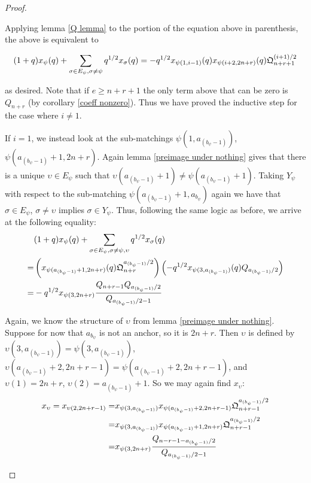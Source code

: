\documentclass{amsart}
\begin{document}
\begin{proof}
\begin{enumerate}[label={case \arabic*:}]
 		Applying lemma \ref{Q lemma} to the portion of the equation above in parenthesis, the above is equivalent to
 		
 		$$(1+q)x_\psi(q)+\sum_{\sigma\in E_\psi,\sigma\not=\psi}q^{1/2}x_\sigma(q)=-q^{1/2}x_{\psi(1,i-1)}(q)x_{\psi(i+2,2n+r)}(q)\mathfrak{Q}_{n+r+1}^{(i+1)/2}$$
 		
 		as desired. Note that if $e\geq n+r+1$ the only term above that can be zero is $Q_{n+r}$ (by corollary \ref{coeff nonzero}). Thus we have proved the inductive step for the case where $i\not=1$.
 		
 		\vspace{5mm}
 		If $i=1$, we instead look at the sub-matchings $\psi(1,a_{(b_\psi-1)})$, $\psi(a_{(b_\psi-1)}+1,2n+r)$. Again lemma \ref{preimage under nothing} gives that there is a unique $\upsilon\in E_\psi$ such that $\upsilon(a_{(b_\psi-1)}+1)\not=\psi(a_{(b_\psi-1)}+1)$. Taking $Y_\psi$ with respect to the sub-matching $\psi(a_{(b_\psi-1)}+1,a_{b_\psi})$ again we have that $\sigma\in E_\psi$, $\sigma\not=\upsilon$ implies $\sigma\in Y_\psi$. Thus, following the same logic as before, we arrive at the following equality:
 		\begin{align*}
 		&(1+q)x_\psi(q)+\sum_{\sigma\in E_\psi,\sigma\not=\psi,\upsilon}q^{1/2}x_\sigma(q)\\
 		=&\left( x_{\psi(a_{(b_\psi-1)}+1,2n+r)}(q)\mathfrak{Q}_{n+r}^{a_{(b_\psi-1)}/2} \right)\left( -q^{1/2}x_{\psi(3,a_{(b_\psi-1)})}(q)Q_{a_{(b_\psi-1)}/2} \right)\\
 		=&-q^{1/2}x_{\psi(3,2n+r)}\frac{Q_{n+r-1}Q_{a_{(b_\psi-1)}/2}}{Q_{a_{(b_\psi-1)}/2-1}}
 		\end{align*}
 		
 		Again, we know the structure of $\upsilon$ from lemma \ref{preimage under nothing}. Suppose for now that $a_{b_\psi}$ is not an anchor, so it is $2n+r$. Then $\upsilon$ is defined by $\upsilon(3,a_{(b_\psi-1)})=\psi(3,a_{(b_\psi-1)})$, $\upsilon(a_{(b_\psi-1)}+2,2n+r-1)=\psi(a_{(b_\psi-1)}+2,2n+r-1)$, and $\upsilon(1)=2n+r$, $\upsilon(2)=a_{(b_\psi-1)}+1$. So we may again find $x_\upsilon$:
 		\begin{align*}
 		x_\upsilon=x_{\upsilon(2,2n+r-1)}=&x_{\psi(3,a_{(b_\psi-1)})}x_{\psi(a_{(b_\psi-1)}+2,2n+r-1)}\mathfrak{Q}_{n+r-1}^{a_{(b_\psi-1)}/2}\\
 		=&x_{\psi(3,a_{(b_\psi-1)})}x_{\psi(a_{(b_\psi-1)}+1,2n+r)}\mathfrak{Q}_{n+r-1}^{a_{(b_\psi-1)}/2}\\
 		=&x_{\psi(3,2n+r)}\frac{Q_{n-r-1-a_{(b_\psi-1)}/2}}{Q_{a_{(b_\psi-1)}/2-1}}
 		\end{align*}
 		

\end{enumerate}
\end{proof}
\end{document}
